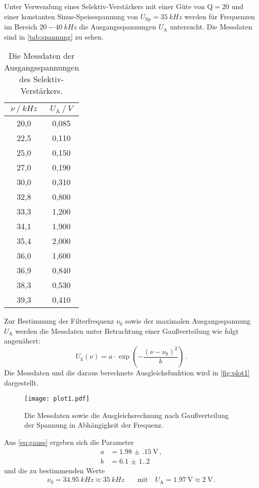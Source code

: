 Unter Verwendung eines Selektiv-Verstärkers mit einer Güte von $\text{Q} = 20$
und einer konstanten Sinus-Speisespannung von $U_\text{Sp} = \qty{35}{kHz}$ 
werden für Frequenzen im Bereich $20 - \qty{40}{kHz}$ die
Ausgangsspannungen $U_\text{A}$ untersucht.
Die Messdaten sind in \autoref{tab:spannung} zu sehen.
\begin{table}[H]
  \centering
  \caption{Die Messdaten der Ausgangsspannungen des Selektiv-Verstärkers.}
  \label{tab:spannung}
  \begin{tabular}{c c}
    \toprule
    $\nu \mathbin{/} \unit{kHz}$ & $U_\text{A} \mathbin{/} \unit{V}$ \\
    \midrule
      20,0 & 0,085 \\
      22,5 & 0,110 \\
      25,0 & 0,150 \\
      27,0 & 0,190 \\
      30,0 & 0,310 \\
      32,8 & 0,800 \\
      33,3 & 1,200 \\
      34,1 & 1,900 \\
      35,4 & 2,000 \\
      36,0 & 1,600 \\
      36,9 & 0,840 \\
      38,3 & 0,530 \\
      39,3 & 0,410 \\
    \bottomrule
  \end{tabular}
\end{table}

Zur Bestimmung der Filterfrequenz $\nu_\text{0}$ sowie der maximalen Ausgangsspannung $U_\text{A}$ 
werden die Messdaten unter Betrachtung einer Gaußverteilung wie folgt angenähert:
\begin{equation}\label{eq:gauss}
  U_\text{g}(\nu) = a \cdot \exp\left( -\frac{(\nu-\nu_\text{0})^2}{b} \right) \, .
\end{equation}
Die Messdaten und die daraus berechnete Ausgleichsfunktion wird in \autoref{fig:plot1} dargestellt.
\begin{figure}
  \centering
  \texttt{[image: plot1.pdf]}
  \caption{Die Messdaten sowie die Ausgleichsrechnung nach Gaußverteilung der Spannung in Abhängigkeit der Frequenz.}
  \label{fig:plot1}
\end{figure}
Aus \autoref{eq:gauss} ergeben sich die Parameter
\begin{align*}
  a &= \qty{1.98(15)}{\volt} \, ,\\
  b &= \num{6.1(1.2)} 
\end{align*}
und die zu bestimmenden Werte
\begin{align*}
  \nu_\text{0} = \qty{34.95}{kHz} \approx \qty{35}{kHz} &\quad 
  \text{mit} \quad U_\text{A} = \qty{1.97}{\volt} \approx \qty{2}{\volt} \, .
\end{align*}




